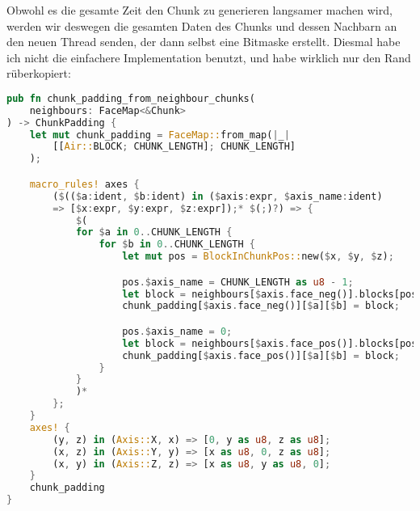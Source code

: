 Obwohl es die gesamte Zeit den Chunk zu generieren
langsamer machen wird, werden wir deswegen die gesamten
Daten des Chunks und dessen Nachbarn an den neuen
Thread senden, der dann selbst eine Bitmaske erstellt.
Diesmal habe ich nicht die einfachere Implementation
benutzt, und habe wirklich nur den Rand rüberkopiert:

\begin{lstlisting}[language=Rust]
pub fn chunk_padding_from_neighbour_chunks(
	neighbours: FaceMap<&Chunk>
) -> ChunkPadding {
	let mut chunk_padding = FaceMap::from_map(|_|
		[[Air::BLOCK; CHUNK_LENGTH]; CHUNK_LENGTH]
	);

	macro_rules! axes {
		($(($a:ident, $b:ident) in ($axis:expr, $axis_name:ident)
		=> [$x:expr, $y:expr, $z:expr]);* $(;)?) => {
			$(
			for $a in 0..CHUNK_LENGTH {
				for $b in 0..CHUNK_LENGTH {
					let mut pos = BlockInChunkPos::new($x, $y, $z);

					pos.$axis_name = CHUNK_LENGTH as u8 - 1;
					let block = neighbours[$axis.face_neg()].blocks[pos];
					chunk_padding[$axis.face_neg()][$a][$b] = block;

					pos.$axis_name = 0;
					let block = neighbours[$axis.face_pos()].blocks[pos];
					chunk_padding[$axis.face_pos()][$a][$b] = block;
				}
			}
			)*
		};
	}
	axes! {
		(y, z) in (Axis::X, x) => [0, y as u8, z as u8];
		(x, z) in (Axis::Y, y) => [x as u8, 0, z as u8];
		(x, y) in (Axis::Z, z) => [x as u8, y as u8, 0];
	}
	chunk_padding
}
\end{lstlisting}


